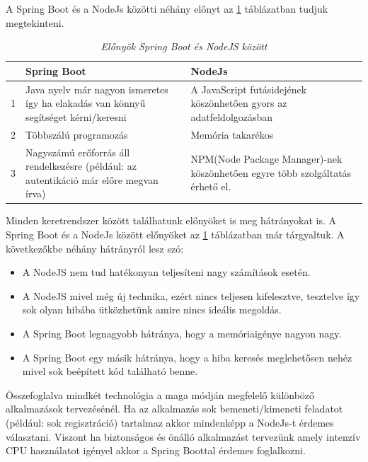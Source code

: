 A Spring Boot és a NodeJs közötti néhány előnyt \cite{nodespringcomp} az \ref{tab:tableSpringNodeJsPros} táblázatban tudjuk megtekinteni.
\begin{table}[H]
	\begin{footnotesize}
		\begin{center}
			\caption[Előnyök Spring Boot és NodeJS között]{\textit{Előnyök Spring Boot és NodeJS között}}
			\label{tab:tableSpringNodeJsPros}
			\begin{tabular}{p{0.5cm}|p{6cm}|p{6cm}}
				\textbf & \textbf{Spring Boot} & \textbf{NodeJs}\\
				\hline
				1 & Java nyelv már nagyon ismeretes így ha elakadás van könnyű segítséget kérni/keresni& A JavaScript futásidejének köszönhetően gyors az adatfeldolgozásban\\
				\hline
				2 & Többszálú programozás & Memória takarékos\\
				\hline
				3 & Nagyszámú erőforrás áll rendelkezésre (például: az autentikáció már előre megvan írva) & NPM(Node Package Manager)-nek köszönhetően egyre több szolgáltatás érhető el. \\
			\end{tabular}
		\end{center}
	\end{footnotesize}
\end{table}

Minden keretrendszer között találhatunk előnyöket is meg hátrányokat is. A Spring Boot és a NodeJs között előnyöket az \ref{tab:tableSpringNodeJsPros} táblázatban már tárgyaltuk. A következőkbe néhány hátrányról \cite{nodespringcomp} lesz szó: 
\begin{itemize}
	\item A NodeJS nem tud hatékonyan teljesíteni nagy számítások esetén.
	\item A NodeJS mivel még új technika, ezért nincs teljesen kifelesztve, tesztelve így sok olyan hibába ütközhetünk amire nincs ideális megoldás.
	\item A Spring Boot legnagyobb hátránya, hogy a memóriaigénye nagyon nagy.
	\item A Spring Boot egy másik hátránya, hogy a hiba keresés meglehetősen nehéz mivel sok beépített kód található benne.
\end{itemize}

Összefoglalva mindkét technológia a maga módján megfelelő különböző alkalmazások tervezésénél. Ha az alkalmazás sok bemeneti/kimeneti feladatot (például: sok regisztráció) tartalmaz akkor mindenképp a NodeJs-t érdemes választani. Viszont ha biztonságos és önálló alkalmazást tervezünk amely intenzív CPU használatot igényel akkor a Spring Boottal érdemes foglalkozni.